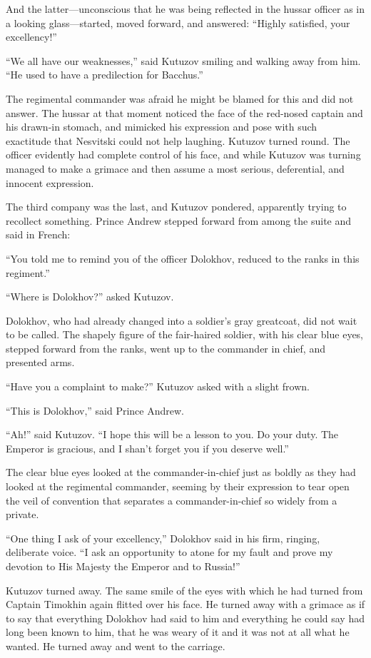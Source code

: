 And the latter---unconscious that he was being reflected in the
hussar officer as in a looking glass---started, moved forward,
and answered: ``Highly satisfied, your excellency!''

``We all have our weaknesses,'' said Kutuzov smiling and walking
away from him. ``He used to have a predilection for Bacchus.''

The regimental commander was afraid he might be blamed for this
and did not answer. The hussar at that moment noticed the face of
the red-nosed captain and his drawn-in stomach, and mimicked his
expression and pose with such exactitude that Nesvitski could not
help laughing. Kutuzov turned round. The officer evidently had
complete control of his face, and while Kutuzov was turning
managed to make a grimace and then assume a most serious,
deferential, and innocent expression.

The third company was the last, and Kutuzov pondered, apparently
trying to recollect something. Prince Andrew stepped forward from
among the suite and said in French:

``You told me to remind you of the officer Dolokhov, reduced to
the ranks in this regiment.''

``Where is Dolokhov?'' asked Kutuzov.

Dolokhov, who had already changed into a soldier's gray
greatcoat, did not wait to be called. The shapely figure of the
fair-haired soldier, with his clear blue eyes, stepped forward
from the ranks, went up to the commander in chief, and presented
arms.

``Have you a complaint to make?'' Kutuzov asked with a slight
frown.

``This is Dolokhov,'' said Prince Andrew.

``Ah!'' said Kutuzov. ``I hope this will be a lesson to you. Do
your duty.  The Emperor is gracious, and I shan't forget you if
you deserve well.''

The clear blue eyes looked at the commander-in-chief just as
boldly as they had looked at the regimental commander, seeming by
their expression to tear open the veil of convention that
separates a commander-in-chief so widely from a private.

``One thing I ask of your excellency,'' Dolokhov said in his
firm, ringing, deliberate voice. ``I ask an opportunity to atone
for my fault and prove my devotion to His Majesty the Emperor and
to Russia!''

Kutuzov turned away. The same smile of the eyes with which he had
turned from Captain Timokhin again flitted over his face. He
turned away with a grimace as if to say that everything Dolokhov
had said to him and everything he could say had long been known
to him, that he was weary of it and it was not at all what he
wanted. He turned away and went to the carriage.

